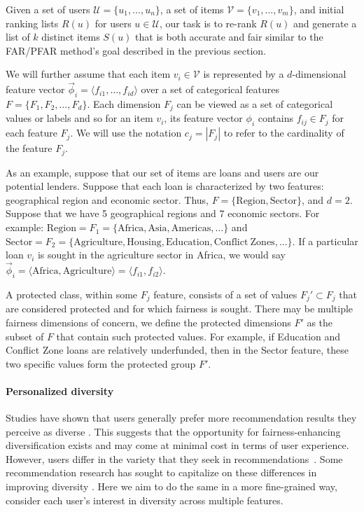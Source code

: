 Given a set of users $\mathcal U=\{u_1,\ldots,u_n\}$, a set of items $\mathcal V=\{v_1,\ldots,v_m\}$, and initial ranking lists $R(u)$ for users $u\in \mathcal U$, our task is to re-rank $R(u)$ and generate a list of $k$ distinct items $S(u)$ that is both accurate and fair similar to the FAR/PFAR method's goal \cite{liu2019personalized} described in the previous section.

We will further assume that each item $v_i\in\mathcal V$ is represented by a $d$-dimensional feature vector $\vec{\phi}_i = \langle f_{i1},\ldots,f_{id}\rangle$ over a set of categorical features $F = \{F_1, F_2, \ldots, F_d\}$. Each dimension $F_j$ can be viewed as a set of categorical values or labels and so for an item $v_i$, its feature vector $\phi_i$ contains $f_{ij} \in F_j$ for each feature $F_j$. We will use the notation $c_j = |F_j|$ to refer to the cardinality of the feature $F_{j}$.

As an example, suppose that our set of items are loans and users are our potential lenders. Suppose that each loan is characterized by two features: geographical region and economic sector. Thus, $F = \{\mathrm{Region}, \mathrm{Sector} \}$, and $d = 2$. Suppose that we have 5 geographical regions and 7 economic sectors. For example:  $\mathrm{Region} = F_1 = \{\mbox{Africa}, \mbox{Asia}, \mbox{Americas}, \ldots\}$ and $\mathrm{Sector} = F_2 = \{\mathrm{Agriculture}, \mathrm{Housing}, \mathrm{Education}, \mathrm{Conflict~Zones}, \ldots\}$. If a particular loan $v_i$ is sought in the agriculture sector in Africa, we would say $\vec{\phi}_i = \langle \mathrm{Africa}, \mathrm{Agriculture} \rangle = \langle f_{i1}, f_{i2} \rangle$.

A protected class, within some $F_j$ feature, consists of a set of values $F_j' \subset F_j$ that are considered protected and for which fairness is sought. There may be multiple fairness dimensions of concern, we define the protected dimensions  $F'$ as the subset of $F$ that contain such protected values. For example, if Education and Conflict Zone loans are relatively underfunded, then in the Sector feature, these two specific values form the protected group $F'$. 

\noindent\paragraph{\textbf{Personalized diversity}}
\newline
\indent Studies have shown that users generally prefer more recommendation results they perceive as diverse \cite{hu2011enhancing}. This suggests that the opportunity for fairness-enhancing diversification exists and may come at minimal cost in terms of user experience. However, users differ in the variety that they seek in recommendations~\cite{tintarev2013adapting}. Some recommendation research has sought to capitalize on these differences in improving diversity \cite{eskandanianuser_2016}. Here we aim to do the same in a more fine-grained way, consider each user's interest in diversity across multiple features.

